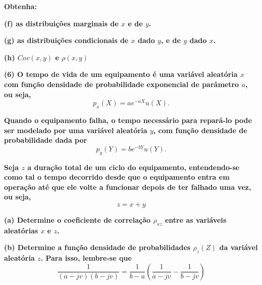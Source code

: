 \documentclass[12pt]{report}
\newenvironment{boldenv}
  {\bfseries}%
  {}%
\begin{document}
\begin{boldenv}
    Obtenha:
\end{boldenv}

\begin{boldenv}
    (f) as distribuições marginais de $x$ e de $y$.
\end{boldenv}

\begin{boldenv}
    (g) as distribuições condicionais de $x$ dado $y$, e de $y$ dado $x$.
\end{boldenv}

\begin{boldenv}
    (h) $Cov(x, y)$ e $\rho(x, y)$
\end{boldenv}

\vspace{\baselineskip}


\begin{boldenv}
    (6) O tempo de vida de um equipamento é uma variável aleatória $x$ com função densidade de probabilidade exponencial de parâmetro $a$, ou seja,
\end{boldenv}
\[p_x(X) = ae^{-aX}u(X).\]

\begin{boldenv}
    Quando o equipamento falha, o tempo necessário para repará-lo pode ser modelado por uma variável aleatória $y$, com função densidade de probabilidade dada por
\end{boldenv}
\[p_y(Y) = be^{-bY}u(Y).\]

\begin{boldenv}
    Seja $z$ a duração total de um ciclo do equipamento, entendendo-se como tal o tempo decorrido desde que o equipamento entra em operação até que ele volte a funcionar depois de ter falhado uma vez, ou seja,
\end{boldenv}
\[z = x + y\]

\begin{boldenv}
    (a) Determine o coeficiente de correlação $\rho_{xz}$ entre as variáveis aleatórias $x$ e $z$.
\end{boldenv}

\begin{boldenv}
    (b) Determine a função densidade de probabilidades $\rho_z(Z)$ da variável aleatória $z$. Para isso, lembre-se que
\end{boldenv}
\[\frac{1}{(a - jv)(b - jv)} = \frac{1}{b - a} \left(\frac{1}{a - jv} - \frac{1}{b - jv}\right)\]
\end{document}
